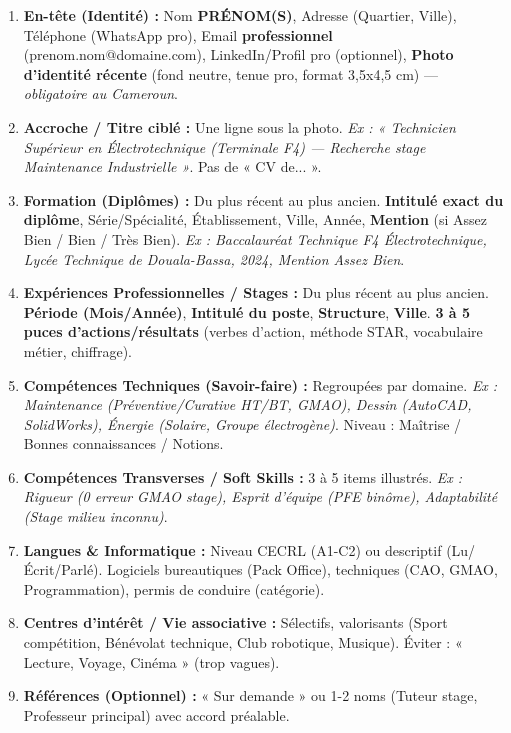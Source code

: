 \documentclass[11pt]{article}
\begin{document}
\begin{methode}
\begin{enumerate}
    \item \textbf{En-tête (Identité) :} Nom \textbf{PRÉNOM(S)}, Adresse (Quartier, Ville), Téléphone (WhatsApp pro), Email \textbf{professionnel} (prenom.nom@domaine.com), LinkedIn/Profil pro (optionnel), \textbf{Photo d'identité récente} (fond neutre, tenue pro, format 3,5x4,5 cm) — \emph{obligatoire au Cameroun}.
    \item \textbf{Accroche / Titre ciblé :} Une ligne sous la photo. \emph{Ex : « Technicien Supérieur en Électrotechnique (Terminale F4) — Recherche stage Maintenance Industrielle »}. Pas de « CV de... ».
    \item \textbf{Formation (Diplômes) :} Du plus récent au plus ancien. \textbf{Intitulé exact du diplôme}, Série/Spécialité, Établissement, Ville, Année, \textbf{Mention} (si Assez Bien / Bien / Très Bien). \emph{Ex : Baccalauréat Technique F4 Électrotechnique, Lycée Technique de Douala-Bassa, 2024, Mention Assez Bien}.
    \item \textbf{Expériences Professionnelles / Stages :} Du plus récent au plus ancien. \textbf{Période (Mois/Année)}, \textbf{Intitulé du poste}, \textbf{Structure}, \textbf{Ville}. \textbf{3 à 5 puces d'actions/résultats} (verbes d'action, méthode STAR, vocabulaire métier, chiffrage).
    \item \textbf{Compétences Techniques (Savoir-faire) :} Regroupées par domaine. \emph{Ex : Maintenance (Préventive/Curative HT/BT, GMAO), Dessin (AutoCAD, SolidWorks), Énergie (Solaire, Groupe électrogène)}. Niveau : Maîtrise / Bonnes connaissances / Notions.
    \item \textbf{Compétences Transverses / Soft Skills :} 3 à 5 items illustrés. \emph{Ex : Rigueur (0 erreur GMAO stage), Esprit d'équipe (PFE binôme), Adaptabilité (Stage milieu inconnu)}.
    \item \textbf{Langues \& Informatique :} Niveau CECRL (A1-C2) ou descriptif (Lu/Écrit/Parlé). Logiciels bureautiques (Pack Office), techniques (CAO, GMAO, Programmation), permis de conduire (catégorie).
    \item \textbf{Centres d'intérêt / Vie associative :} Sélectifs, valorisants (Sport compétition, Bénévolat technique, Club robotique, Musique). Éviter : « Lecture, Voyage, Cinéma » (trop vagues).
    \item \textbf{Références (Optionnel) :} « Sur demande » ou 1-2 noms (Tuteur stage, Professeur principal) avec accord préalable.
\end{enumerate}
\end{methode}
\end{document}

